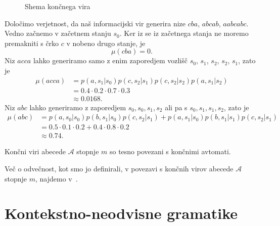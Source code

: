 \documentclass[fin1, tisk]{fmfdelo}
\newcommand{\A}{\mathcal{A}}
\theoremstyle{definition}
\begin{document}
\begin{primer}
\begin{figure}[H]
        \caption{Shema končnega vira}
        \label{fig:FSM}
    \end{figure}
    Določimo verjetnost, da naš informacijski vir generira nize $\mathit{cba}$, $\mathit{abcab}$, 
    $\mathit{aabcabc}$. Vedno začnemo v začetnem stanju $s_0$. Ker iz se iz začetnega stanja 
    ne moremo premakniti s črko $c$ v nobeno drugo stanje, je
    \[
        \mu(\mathit{cba}) = 0.
    \]
    Niz $\mathit{acca}$ lahko generiramo samo z enim zaporedjem vozlišč 
    $s_0$, $s_1$, $s_2$, $s_2$, $s_1$, zato je
    \begin{align*}
        \mu(\mathit{acca}) &= p(a, s_1|s_0)p(c, s_2|s_1)p(c, s_2|s_2)p(a, s_1|s_2) \\
        &= 0.4 \cdot 0.2 \cdot 0.7 \cdot 0.3 \\
        &\approx 0.0168.
    \end{align*}
    Niz $\mathit{abc}$ lahko generiramo z zaporedjem $s_0, s_0, s_1, s_2$ ali pa s
    $s_0, s_1, s_1, s_2$, zato je
    \begin{align*}
        \mu(\mathit{abc}) &= p(a, s_0|s_0)p(b, s_1|s_0)p(c, s_2|s_1) 
        + p(a, s_1|s_0)p(b, s_1|s_1)p(c, s_2|s_1) \\
        &= 0.5 \cdot 0.1 \cdot 0.2 + 0.4 \cdot 0.8 \cdot 0.2 \\
        &\approx 0.74.
    \end{align*}
\end{primer}

\begin{opomba} %
    Končni viri abecede $\A$ stopnje $m$ so tesno povezani s končnimi avtomati.
\end{opomba}

Več o odvečnost, kot smo jo definirali, v povezavi s končnih virov abecede $\A$ stopnje $m$,
najdemo v~\cite{Plotkin1992}.

\section{Kontekstno-neodvisne gramatike}
\end{document}

